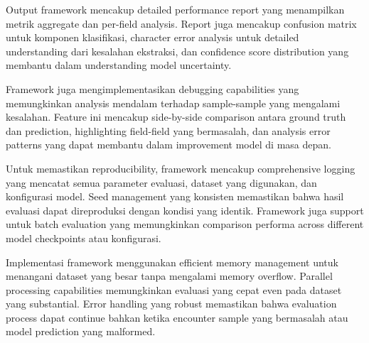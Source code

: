 
Output framework mencakup detailed performance report yang menampilkan metrik aggregate dan per-field analysis. Report juga mencakup confusion matrix untuk komponen klasifikasi, character error analysis untuk detailed understanding dari kesalahan ekstraksi, dan confidence score distribution yang membantu dalam understanding model uncertainty.

Framework juga mengimplementasikan debugging capabilities yang memungkinkan analysis mendalam terhadap sample-sample yang mengalami kesalahan. Feature ini mencakup side-by-side comparison antara ground truth dan prediction, highlighting field-field yang bermasalah, dan analysis error patterns yang dapat membantu dalam improvement model di masa depan.

Untuk memastikan reproducibility, framework mencakup comprehensive logging yang mencatat semua parameter evaluasi, dataset yang digunakan, dan konfigurasi model. Seed management yang konsisten memastikan bahwa hasil evaluasi dapat direproduksi dengan kondisi yang identik. Framework juga support untuk batch evaluation yang memungkinkan comparison performa across different model checkpoints atau konfigurasi.

Implementasi framework menggunakan efficient memory management untuk menangani dataset yang besar tanpa mengalami memory overflow. Parallel processing capabilities memungkinkan evaluasi yang cepat even pada dataset yang substantial. Error handling yang robust memastikan bahwa evaluation process dapat continue bahkan ketika encounter sample yang bermasalah atau model prediction yang malformed.
